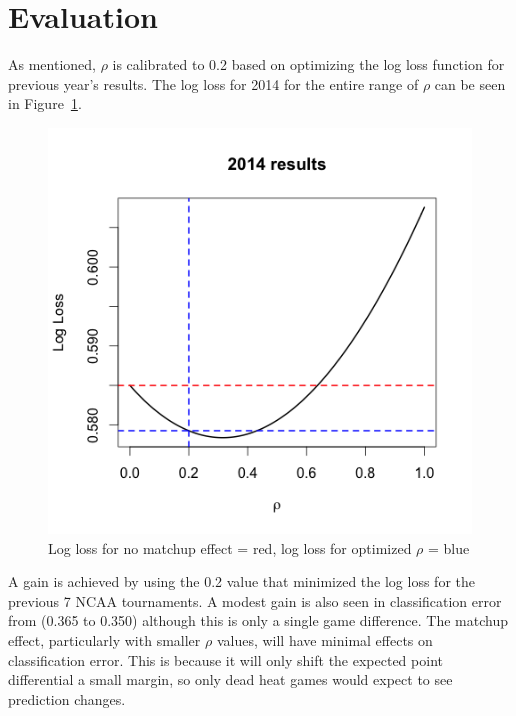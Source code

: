 \section{Evaluation}
As mentioned, $\rho$ is calibrated to 0.2 based on optimizing the log loss function for previous year's results.  The log loss for 2014 for the entire range of $\rho$ can be seen in Figure~\ref{fig:result}.
\begin{figure}[h]
\includegraphics[width=1\textwidth]{results_2014.png}
\caption{Log loss for no matchup effect = red, log loss for optimized $\rho$ = blue}
\label{fig:result}
\end{figure}
A  gain is achieved by using the 0.2 value that minimized the log loss for the previous 7 NCAA tournaments.  A modest gain is also seen in classification error from (0.365 to 0.350) although this is only a single game difference.  The matchup effect, particularly with smaller $\rho$ values, will have minimal effects on classification error.  This is because it will only shift the expected point differential a small margin, so only dead heat games would expect to see prediction changes.

